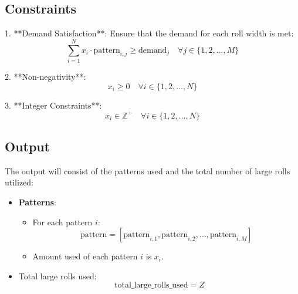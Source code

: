 \documentclass{article}
\begin{document}
\subsection*{Constraints}

1. **Demand Satisfaction**:
   Ensure that the demand for each roll width is met:
   \[
   \sum_{i=1}^{N} x_i \cdot \text{pattern}_{i,j} \geq \text{demand}_j \quad \forall j \in \{1, 2, \ldots, M\}
   \]

2. **Non-negativity**:
   \[
   x_i \geq 0 \quad \forall i \in \{1, 2, \ldots, N\}
   \]

3. **Integer Constraints**:
   \[
   x_i \in \mathbb{Z}^+ \quad \forall i \in \{1, 2, \ldots, N\}
   \]

\subsection*{Output}
The output will consist of the patterns used and the total number of large rolls utilized:

\begin{itemize}
    \item \textbf{Patterns}:
    \begin{itemize}
        \item For each pattern \( i \):
        \[
        \text{pattern} = [\text{pattern}_{i,1}, \text{pattern}_{i,2}, \ldots, \text{pattern}_{i,M}]
        \]
        \item Amount used of each pattern \( i \) is \( x_i \).
    \end{itemize}
    \item Total large rolls used:
    \[
    \text{total\_large\_rolls\_used} = Z
    \]
\end{itemize}
\end{document}
